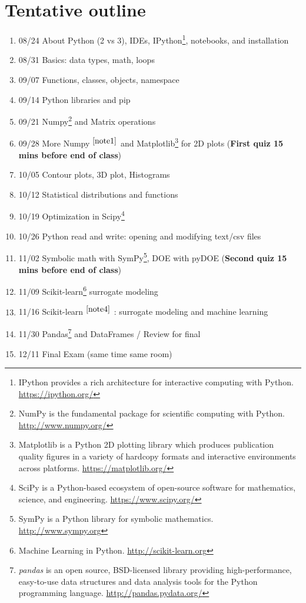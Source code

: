 \documentclass{article}
\newcommand{\footref}[1]{%
    $^{\ref{#1}}$%
}
\begin{document}
\section{Tentative outline}
\begin{enumerate}
\item 08/24 About Python (2 vs 3), IDEs, IPython\footnote{IPython provides a rich architecture for interactive computing with Python. \url{https://ipython.org/}}, notebooks, and installation
\item 08/31 Basics: data types, math, loops 
\item 09/07 Functions, classes, objects, namespace
\item 09/14 Python libraries and pip
\item 09/21 Numpy\footnote{NumPy is the fundamental package for scientific computing with Python. \url{http://www.numpy.org/}\label{note1}} and Matrix operations
\item 09/28 More Numpy\footref{note1} and Matplotlib\footnote{Matplotlib is a Python 2D plotting library which produces publication quality figures in a variety of hardcopy formats and interactive environments across platforms. \url{https://matplotlib.org/}\label{note3}} for 2D plots (\textbf{First quiz 15 mins before end of class})
\item 10/05 Contour plots, 3D plot, Histograms
\item 10/12 Statistical distributions and functions
\item 10/19 Optimization in Scipy\footnote{SciPy is a Python-based ecosystem of open-source software for mathematics, science, and engineering. \url{https://www.scipy.org/}\label{note2}}
\item 10/26 Python read and write: opening and modifying text/csv files
\item 11/02 Symbolic math with SymPy\footnote{SymPy is a Python library for symbolic mathematics. \url{http://www.sympy.org}}, DOE with pyDOE (\textbf{Second quiz 15 mins before end of class})
\item 11/09 Scikit-learn\footnote{Machine Learning in Python. \url{http://scikit-learn.org}\label{note4}} surrogate modeling 
\item 11/16 Scikit-learn\footref{note4}: surrogate modeling and machine learning
\item 11/30 Pandas\footnote{\textit{pandas} is an open source, BSD-licensed library providing high-performance, easy-to-use data structures and data analysis tools for the Python programming language. \url{http://pandas.pydata.org/}} and DataFrames / Review for final
\item 12/11 Final Exam (same time same room)
\end{enumerate}
\end{document}
